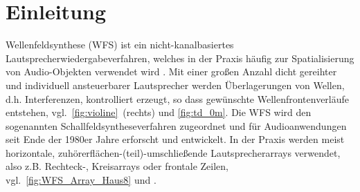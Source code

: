 

\section{Einleitung}
\label{sec:WFSIntro}
%
Wellenfeldsynthese (WFS) \cite{Vries2009_Mono, Sporer2018_book}
ist ein nicht-kanalbasiertes Lautsprecherwiedergabeverfahren, welches in der Praxis
häufig zur Spatialisierung von Audio-Objekten verwendet wird \cite{Ranjan2013_IEEE}.
%
Mit einer großen Anzahl dicht gereihter und individuell ansteuerbarer Lautsprecher
werden Überlagerungen von Wellen, d.h. Interferenzen, kontrolliert erzeugt,
so dass gewünschte Wellenfrontenverläufe
entstehen, vgl.~\Abb\ref{fig:violine}~(rechts) und \Abb\ref{fig:td_0m}.
%
Die WFS wird den sogenannten Schallfeldsyntheseverfahren
zugeordnet \cite{Spors2013_IEEE}
%
und für Audioanwendungen seit Ende der 1980er Jahre \cite{Berkhout1988_JAES}
erforscht und entwickelt.
%
In der Praxis werden meist horizontale, zuhörerflächen-(teil)-umschließende
Lautsprecherarrays verwendet, also z.B. Rechteck-, Kreisarrays oder frontale
Zeilen, vgl.~\Abb\ref{fig:WFS_Array_Haus8} und \cite{Vries2009_Mono, Vries2019}.



